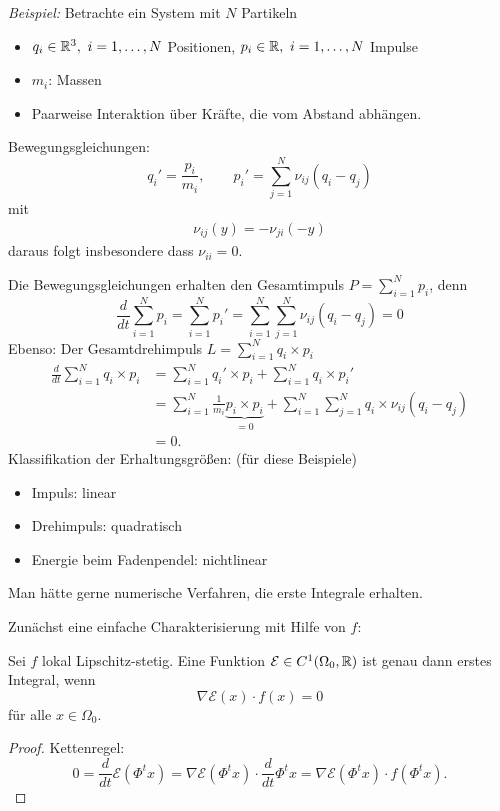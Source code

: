 \emph{Beispiel:} Betrachte ein System mit $N$ Partikeln
\begin{itemize}
	\item $q_i\in\mathbb R^3,\ i=1,\hdots,N$ Positionen, $p_i\in\mathbb R,\ i=1,\hdots,N$ Impulse
        \item $m_i$: Massen
 \item Paarweise Interaktion über Kräfte, die vom Abstand abhängen.
\end{itemize}
Bewegungsgleichungen:
\begin{equation*}
	q_i'=\frac{p_i}{m_i},\qquad p_i' = \sum_{j=1}^N \nu_{ij}(q_i-q_j)
\end{equation*}
mit
\begin{align*}
 \nu_{ij}(y) = - \nu_{ji}(-y)
\end{align*}
daraus folgt insbesondere dass $\nu_{ii} = 0$.

Die Bewegungsgleichungen erhalten den Gesamtimpuls $P=\sum_{i=1}^Np_i$, denn
\begin{equation*}
 \frac{d}{dt}\sum_{i=1}^Np_i = \sum_{i=1}^N p_i' = \sum_{i=1}^N\sum_{j=1}^N\nu_{ij}(q_i-q_j) = 0
\end{equation*}
Ebenso: Der Gesamtdrehimpuls $L=\sum_{i=1}^N q_i\times p_i$
\begin{align*}
\frac{d}{dt}\sum_{i=1}^N q_i\times p_i
 & = \sum_{i=1}^N q_i'\times p_i+\sum_{i=1}^N q_i\times p_i' \\
 & = \sum_{i=1}^N \frac{1}{m_i}\underbrace{p_i\times p_i}_{=0} + \sum_{i=1}^N\sum_{j=1}^Nq_i\times\nu_{ij}(q_i-q_j) \\
 & = 0.
\end{align*}
Klassifikation der Erhaltungsgrößen: (für diese Beispiele)
\begin{itemize}
 \item Impuls: linear
 \item Drehimpuls: quadratisch
 \item Energie beim Fadenpendel: nichtlinear
\end{itemize}
Man hätte gerne numerische Verfahren, die erste Integrale erhalten.

\medskip

Zunächst eine einfache Charakterisierung mit Hilfe von $f$:
\begin{lemma}
 Sei $f$ lokal Lipschitz-stetig. Eine Funktion $\mathcal E\in C^1(\Omega_0,\mathbb R)$ ist genau dann
 erstes Integral, wenn
 \begin{equation*}
  \nabla\mathcal E(x)\cdot f(x) = 0
	\end{equation*}
	für alle $x\in\Omega_0$.
\end{lemma}
\begin{proof}
	Kettenregel:
 \begin{equation*}
  0
  =
  \frac{d}{dt} \mathcal E(\Phi^t x)
  =
  \nabla\mathcal E(\Phi^tx)\cdot \frac{d}{dt}\Phi^tx
  =
  \nabla\mathcal E(\Phi^tx)\cdot f(\Phi^tx).  
\end{equation*}
\end{proof}

